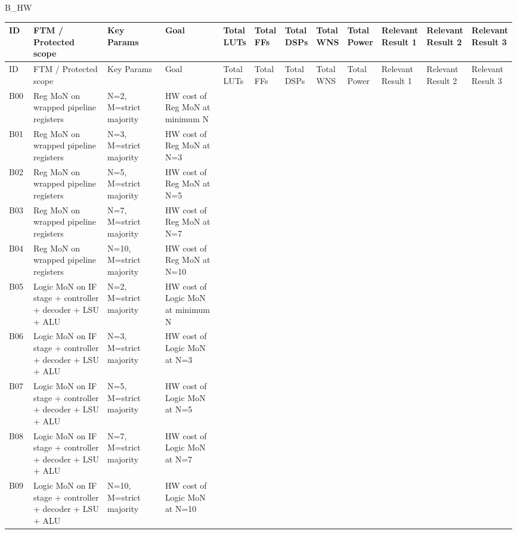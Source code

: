 B\_HW

\begin{longtable}{|p{0.05\linewidth}|p{0.17\linewidth}|p{0.13\linewidth}|p{0.13\linewidth}|p{0.06\linewidth}|p{0.06\linewidth}|p{0.06\linewidth}|p{0.06\linewidth}|p{0.06\linewidth}|p{0.07\linewidth}|p{0.07\linewidth}|p{0.07\linewidth}|}
\hline
ID & FTM / Protected scope & Key Params & Goal & Total LUTs & Total FFs & Total DSPs & Total WNS & Total Power & Relevant Result 1 & Relevant Result 2 & Relevant Result 3 \\
\hline
\endfirsthead
\hline
ID & FTM / Protected scope & Key Params & Goal & Total LUTs & Total FFs & Total DSPs & Total WNS & Total Power & Relevant Result 1 & Relevant Result 2 & Relevant Result 3 \\
\hline
\endhead
B00 & Reg MoN on wrapped pipeline registers & N=2, M=strict majority & HW cost of Reg MoN at minimum N &  &  &  &  &  &  &  &  \\
\hline
B01 & Reg MoN on wrapped pipeline registers & N=3, M=strict majority & HW cost of Reg MoN at N=3 &  &  &  &  &  &  &  &  \\
\hline
B02 & Reg MoN on wrapped pipeline registers & N=5, M=strict majority & HW cost of Reg MoN at N=5 &  &  &  &  &  &  &  &  \\
\hline
B03 & Reg MoN on wrapped pipeline registers & N=7, M=strict majority & HW cost of Reg MoN at N=7 &  &  &  &  &  &  &  &  \\
\hline
B04 & Reg MoN on wrapped pipeline registers & N=10, M=strict majority & HW cost of Reg MoN at N=10 &  &  &  &  &  &  &  &  \\
\hline
B05 & Logic MoN on IF stage + controller + decoder + LSU + ALU & N=2, M=strict majority & HW cost of Logic MoN at minimum N &  &  &  &  &  &  &  &  \\
\hline
B06 & Logic MoN on IF stage + controller + decoder + LSU + ALU & N=3, M=strict majority & HW cost of Logic MoN at N=3 &  &  &  &  &  &  &  &  \\
\hline
B07 & Logic MoN on IF stage + controller + decoder + LSU + ALU & N=5, M=strict majority & HW cost of Logic MoN at N=5 &  &  &  &  &  &  &  &  \\
\hline
B08 & Logic MoN on IF stage + controller + decoder + LSU + ALU & N=7, M=strict majority & HW cost of Logic MoN at N=7 &  &  &  &  &  &  &  &  \\
\hline
B09 & Logic MoN on IF stage + controller + decoder + LSU + ALU & N=10, M=strict majority & HW cost of Logic MoN at N=10 &  &  &  &  &  &  &  &  \\

\end{longtable}
